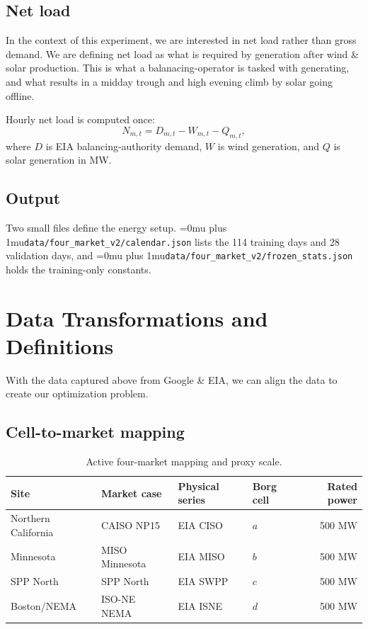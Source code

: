\documentclass[12pt]{article}
\newcommand{\codepath}[1]{{\Urlmuskip=0mu plus 1mu\relax\nolinkurl{#1}}}
\begin{document}
\subsection{Net load}
\label{subsec:energy-net-load}

In the context of this experiment, we are interested in net load rather than gross demand. We are defining net load as what is required by generation after wind \& solar production. This is what a balanacing-operator is tasked with generating, and what results in a midday trough and high evening climb by solar going offline. 

Hourly net load is computed once:
\begin{equation}
  N_{m,t}
  =
  D_{m,t} - W_{m,t} - Q_{m,t},
  \label{eq:energy-net-load}
\end{equation}
where \(D\) is EIA balancing-authority demand, \(W\) is wind generation, and
\(Q\) is solar generation in MW.

\subsection{Output}
\label{subsec:energy-reproduction}

Two small files define the energy setup. \codepath{data/four_market_v2/calendar.json} lists the 114 training days and 28 validation days, and \codepath{data/four_market_v2/frozen_stats.json} holds the training-only constants.

\section{Data Transformations and Definitions}
\label{sec:data-transformations}

With the data captured above from Google \& EIA, we can align the data to create our optimization problem. 

\subsection{Cell-to-market mapping}
\label{subsec:transform-mapping}

\begin{table}[htbp]
  \centering
  \caption{Active four-market mapping and proxy scale.}
  \label{tab:active-market-map}
  \begin{tabular}{@{}llllr@{}}
    \toprule
    Site & Market case & Physical series & Borg cell & Rated power \\
    \midrule
    Northern California & CAISO NP15 & EIA CISO & \(a\) & 500 MW \\
    Minnesota & MISO Minnesota & EIA MISO & \(b\) & 500 MW \\
    SPP North & SPP North & EIA SWPP & \(c\) & 500 MW \\
    Boston/NEMA & ISO-NE NEMA & EIA ISNE & \(d\) & 500 MW \\
    \bottomrule
  \end{tabular}
\end{table}
\end{document}
